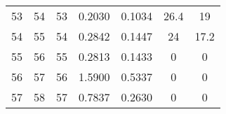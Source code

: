 \begin{table}
\begin{adjustbox}{width=0.95\textwidth,center=\textwidth}
\begin{tabular}{ccccccc}
53                                                        & 54                                                          & 53                                                  & 0.2030                                                                    & 0.1034                                                                    & 26.4                                                                        & 19                                                                               \\
54                                                        & 55                                                          & 54                                                  & 0.2842                                                                    & 0.1447                                                                    & 24                                                                          & 17.2                                                                             \\
55                                                        & 56                                                          & 55                                                  & 0.2813                                                                    & 0.1433                                                                    & 0                                                                           & 0                                                                                \\
56                                                        & 57                                                          & 56                                                  & 1.5900                                                                    & 0.5337                                                                    & 0                                                                           & 0                                                                                \\
57                                                        & 58                                                          & 57                                                  & 0.7837                                                                    & 0.2630                                                                    & 0                                                                           & 0                                                                                \\

\end{tabular}
\end{adjustbox}
\end{table}

